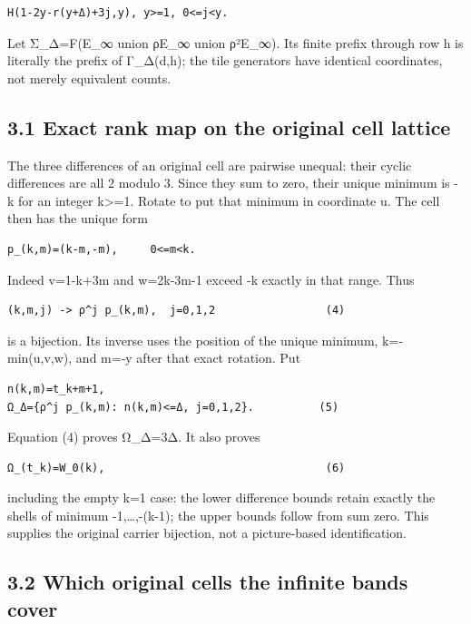 \documentclass[
  10pt,
]{scrreprt}
\begin{document}
\begin{verbatim}
H(1-2y-r(y+Δ)+3j,y), y>=1, 0<=j<y.
\end{verbatim}

Let Σ\_Δ=F(E\_∞ union ρE\_∞ union ρ²E\_∞). Its finite prefix through row
h is literally the prefix of Γ\_Δ(d,h); the tile generators have
identical coordinates, not merely equivalent counts.

\subsection{3.1 Exact rank map on the original cell
lattice}\label{edition-10-section-7}

The three differences of an original cell are pairwise unequal: their
cyclic differences are all 2 modulo 3. Since they sum to zero, their
unique minimum is -k for an integer k\textgreater=1. Rotate to put that
minimum in coordinate u. The cell then has the unique form

\begin{verbatim}
p_(k,m)=(k-m,-m),     0<=m<k.
\end{verbatim}

Indeed v=1-k+3m and w=2k-3m-1 exceed -k exactly in that range. Thus

\begin{verbatim}
(k,m,j) -> ρ^j p_(k,m),  j=0,1,2                 (4)
\end{verbatim}

is a bijection. Its inverse uses the position of the unique minimum,
k=-min(u,v,w), and m=-y after that exact rotation. Put

\begin{verbatim}
n(k,m)=t_k+m+1,
Ω_Δ={ρ^j p_(k,m): n(k,m)<=Δ, j=0,1,2}.          (5)
\end{verbatim}

Equation (4) proves \textbar Ω\_Δ\textbar=3Δ. It also proves

\begin{verbatim}
Ω_(t_k)=W_0(k),                                  (6)
\end{verbatim}

including the empty k=1 case: the lower difference bounds retain exactly
the shells of minimum -1,\ldots,-(k-1); the upper bounds follow from sum
zero. This supplies the original carrier bijection, not a picture-based
identification.

\subsection{3.2 Which original cells the infinite bands
cover}\label{edition-10-section-8}
\end{document}
